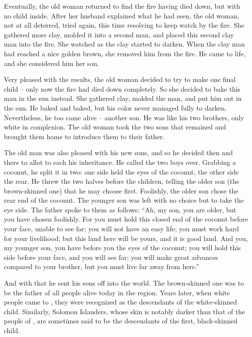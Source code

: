   Eventually, the old woman returned to find the fire having died down, but with no child inside. After her husband explained what he had seen, the old woman, not at all deterred, tried again, this time resolving to keep watch by the fire. She gathered more clay, molded it into a second man, and placed this second clay man into the fire. She watched as the clay started to darken. When the clay man had reached a nice golden brown, she removed him from the fire. He came to life, and she considered him her son.

  Very pleased with the results, the old woman decided to try to make one final child -- only now the fire had died down completely. So she decided to bake this man in the sun instead. She gathered clay, molded the man, and put him out in the sun. He baked and baked, but his color never managed fully to darken. Nevertheless, he too came alive -- another son. He was like his two brothers, only white in complexion. The old woman took the two sons that remained and brought them home to introduce them to their father.

  The old man was also pleased with his new sons, and so he decided then and there to allot to each his inheritance. He called the two boys over. Grabbing a coconut, he split it in two: one side held the eyes of the coconut, the other side the rear. He threw the two halves before the children, telling the older son (the brown-skinned one) that he may choose first. Foolishly, the older son chose the rear end of the coconut. The younger son was left with no choice but to take the eye side. The father spoke to them as follows: “Ah, my son, you are older, but you have chosen foolishly. For you must hold this closed end of the coconut before your face, unable to see far; you will not have an easy life; you must work hard for your livelihood; but this land here will be yours, and it is good land. And you, my younger son, you have before you the eyes of the coconut; you will hold this side before your face, and you will see far; you will make great advances compared to your brother, but you must live far away from here.”

  And with that he sent his sons off into the world. The brown-skinned one was to be the father of all people alive today in the region. Years later, when white people came to , they were recognized as the descendants of the white-skinned child. Similarly, Solomon Islanders, whose skin is notably darker than that of the people of , are sometimes said to be the descendants of the first, black-skinned child.

